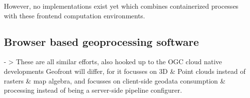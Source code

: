 \m{->} However, no implementations exist yet which combines containerized processes with these frontend computation environments. 




















\subsection{Browser based geoprocessing software}

- >
These are all similar efforts, also hooked up to the OGC cloud native developments
Geofront will differ, for it focusses on 3D \& Point clouds instead of rasters \& map algebra, and focusses on client-side geodata consumption \& processing instead of being a server-side pipeline configurer.

